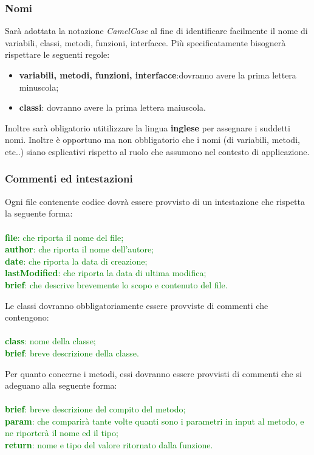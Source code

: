 \subsubsection{Nomi}
Sarà adottata la notazione \textit{CamelCase} al fine di identificare facilmente il nome di variabili, classi, metodi, funzioni, interfacce. Più specificatamente bisognerà rispettare le seguenti regole:
\begin{itemize}
\item \textbf{variabili, metodi, funzioni, interfacce}:dovranno avere la prima lettera minuscola;
\item \textbf{classi}: dovranno avere la prima lettera maiuscola.
\end{itemize}
Inoltre sarà obligatorio utitilizzare la lingua \textbf{inglese} per assegnare i suddetti nomi. 
Inoltre è opportuno ma non obbligatorio che i nomi (di variabili, metodi, etc..) siano esplicativi rispetto al ruolo che assumono nel contesto di applicazione.

\subsubsection{Commenti ed intestazioni}

Ogni file contenente codice dovrà essere provvisto di un intestazione che rispetta la seguente forma:
\\
\\
\textcolor{green}{
\textbf{file}: che riporta il nome del file; \\
\textbf{author}: che riporta il nome dell'autore;\\
\textbf{date}: che riporta la data di creazione; \\
\textbf{lastModified}: che riporta la data di ultima modifica;\\
\textbf{brief}: che descrive brevemente lo scopo e contenuto del file.\\
}

Le classi dovranno obbligatoriamente essere provviste di commenti che contengono:
\\
\\
\textcolor{green}{
\textbf{class}: nome della classe;\\
\textbf{brief}: breve descrizione della classe.\\
}


Per quanto concerne i metodi, essi dovranno essere provvisti di commenti che si adeguano alla seguente forma:
\\
\\
\textcolor{green}{
\textbf{brief}: breve descrizione del compito del metodo;\\
\textbf{param}: che comparirà tante volte quanti sono i parametri in input al metodo, e ne riporterà il nome ed il tipo;\\
\textbf{return}: nome e tipo del valore ritornato dalla funzione.\\}

